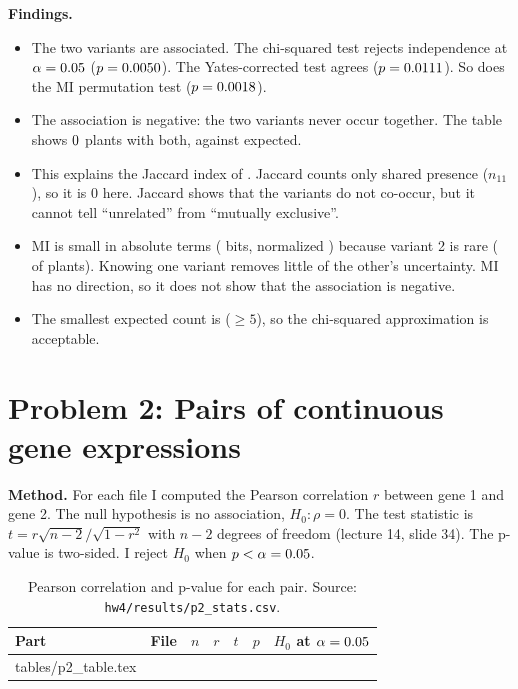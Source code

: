 \documentclass[11pt]{article}
\makeatletter
\newcommand{\gentable}[1]{\@@input #1 }
\makeatother
\begin{document}
\textbf{Findings.}
\begin{itemize}
  \item The two variants are associated. The chi-squared test rejects independence at $\alpha = 0.05$ ($p = 0.0050$).
    The Yates-corrected test agrees ($p = 0.0111$). So does the MI permutation test ($p = 0.0018$).
  \item The association is negative: the two variants never occur together.
    The table shows $0$ plants with both, against \eCOo{} expected.
  \item This explains the Jaccard index of \pOneJac. Jaccard counts only shared presence ($n_{11}$), so it is 0 here.
    Jaccard shows that the variants do not co-occur, but it cannot tell ``unrelated'' from ``mutually exclusive''.
  \item MI is small in absolute terms (\pOneMI{} bits, normalized \pOneNMI) because variant 2 is rare (\nColO{} of \pOneN{} plants).
    Knowing one variant removes little of the other's uncertainty.
    MI has no direction, so it does not show that the association is negative.
  \item The smallest expected count is \pOneMinE{} ($\geq 5$), so the chi-squared approximation is acceptable.
\end{itemize}

\section{Problem 2: Pairs of continuous gene expressions}

\textbf{Method.} For each file I computed the Pearson correlation $r$ between gene 1 and gene 2.
The null hypothesis is no association, $H_0: \rho = 0$.
The test statistic is $t = r\sqrt{n-2}/\sqrt{1-r^2}$ with $n-2$ degrees of freedom (lecture 14, slide 34).
The p-value is two-sided. I reject $H_0$ when $p < \alpha = 0.05$.

\begin{table}[H]
  \centering
  \caption{Pearson correlation and p-value for each pair.
    Source: \texttt{hw4/results/p2\_stats.csv}.}
  \label{tab:p2}
  \begin{tabular}{llrrrll}
    \toprule
    Part & File & $n$ & $r$ & $t$ & $p$ & $H_0$ at $\alpha=0.05$ \\
    \midrule
    \gentable{tables/p2_table.tex}
    \bottomrule
  \end{tabular}
\end{table}
\end{document}
